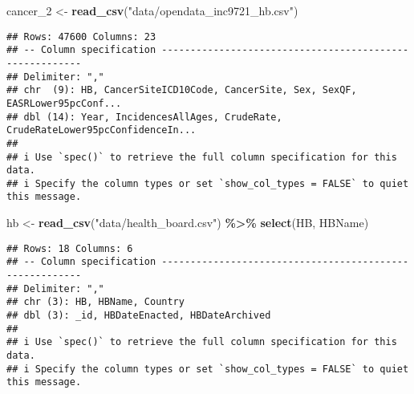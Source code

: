 \documentclass[
]{article}
\newenvironment{Shaded}{\begin{snugshade}}{\end{snugshade}}
\newcommand{\FunctionTok}[1]{\textcolor[rgb]{0.13,0.29,0.53}{\textbf{#1}}}
\newcommand{\NormalTok}[1]{#1}
\newcommand{\OtherTok}[1]{\textcolor[rgb]{0.56,0.35,0.01}{#1}}
\newcommand{\SpecialCharTok}[1]{\textcolor[rgb]{0.81,0.36,0.00}{\textbf{#1}}}
\newcommand{\StringTok}[1]{\textcolor[rgb]{0.31,0.60,0.02}{#1}}
\begin{document}
\begin{Shaded}
\begin{Highlighting}[]
\NormalTok{cancer\_2 }\OtherTok{\textless{}{-}} \FunctionTok{read\_csv}\NormalTok{(}\StringTok{"data/opendata\_inc9721\_hb.csv"}\NormalTok{)}
\end{Highlighting}
\end{Shaded}

\begin{verbatim}
## Rows: 47600 Columns: 23
## -- Column specification --------------------------------------------------------
## Delimiter: ","
## chr  (9): HB, CancerSiteICD10Code, CancerSite, Sex, SexQF, EASRLower95pcConf...
## dbl (14): Year, IncidencesAllAges, CrudeRate, CrudeRateLower95pcConfidenceIn...
## 
## i Use `spec()` to retrieve the full column specification for this data.
## i Specify the column types or set `show_col_types = FALSE` to quiet this message.
\end{verbatim}

\begin{Shaded}
\begin{Highlighting}[]
\NormalTok{hb }\OtherTok{\textless{}{-}} \FunctionTok{read\_csv}\NormalTok{(}\StringTok{"data/health\_board.csv"}\NormalTok{) }\SpecialCharTok{\%\textgreater{}\%} \FunctionTok{select}\NormalTok{(HB, HBName)}
\end{Highlighting}
\end{Shaded}

\begin{verbatim}
## Rows: 18 Columns: 6
## -- Column specification --------------------------------------------------------
## Delimiter: ","
## chr (3): HB, HBName, Country
## dbl (3): _id, HBDateEnacted, HBDateArchived
## 
## i Use `spec()` to retrieve the full column specification for this data.
## i Specify the column types or set `show_col_types = FALSE` to quiet this message.
\end{verbatim}
\end{document}
